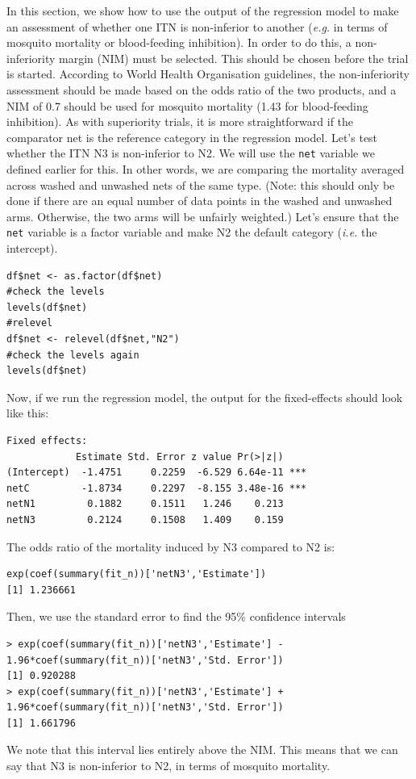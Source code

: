 \documentclass[11pt]{article}
\begin{document}
In this section, we show how to use the output of the regression model to make an assessment of whether one ITN is non-inferior to another (\textit{e.g.} in terms of mosquito mortality or blood-feeding inhibition). In order to do this, a non-inferiority margin (NIM) must be selected. This should be chosen before the trial is started. According to World Health Organisation guidelines, the non-inferiority assessment should be made based on the odds ratio of the two products, and a NIM of 0.7 should be used for mosquito mortality (1.43 for blood-feeding inhibition). As with superiority trials, it is more straightforward if the comparator net is the reference category in the regression model. Let's test whether the ITN N3 is non-inferior to N2. We will use the \verb+net+ variable we defined earlier for this. In other words, we are comparing the mortality averaged across washed and unwashed nets of the same type. (Note: this should only be done if there are an equal number of data points in the washed and unwashed arms. Otherwise, the two arms will be unfairly weighted.) Let's ensure that the \verb+net+ variable is a factor variable and make N2 the default category (\textit{i.e.} the intercept).
\begin{verbatim}
df$net <- as.factor(df$net)
#check the levels
levels(df$net)
#relevel
df$net <- relevel(df$net,"N2") 
#check the levels again
levels(df$net)
\end{verbatim}
Now, if we run the regression model, the output for the fixed-effects should look like this:
\begin{verbatim}
Fixed effects:
            Estimate Std. Error z value Pr(>|z|)    
(Intercept)  -1.4751     0.2259  -6.529 6.64e-11 ***
netC         -1.8734     0.2297  -8.155 3.48e-16 ***
netN1         0.1882     0.1511   1.246    0.213    
netN3         0.2124     0.1508   1.409    0.159    
\end{verbatim}
The odds ratio of the mortality induced by N3 compared to N2 is:
\begin{verbatim}
exp(coef(summary(fit_n))['netN3','Estimate'])
[1] 1.236661
\end{verbatim}
Then, we use the standard error to find the 95\% confidence intervals
\begin{verbatim}
> exp(coef(summary(fit_n))['netN3','Estimate'] -
1.96*coef(summary(fit_n))['netN3','Std. Error'])
[1] 0.920288
> exp(coef(summary(fit_n))['netN3','Estimate'] +
1.96*coef(summary(fit_n))['netN3','Std. Error'])
[1] 1.661796
\end{verbatim}
We note that this interval lies entirely above the NIM. This means that we can say that N3 is non-inferior to N2, in terms of mosquito mortality.
\end{document}
